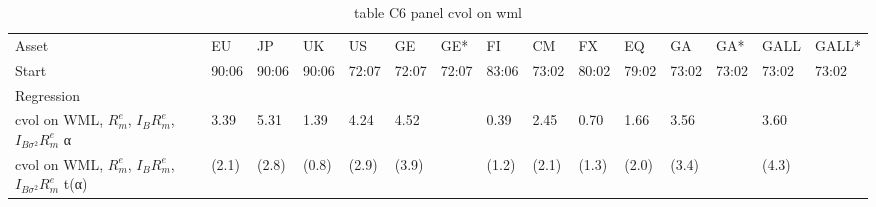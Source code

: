 \begin{table}[htbp]
  \centering
  \caption{table C6 panel cvol on wml}
  \label{tab:table_C6_panel_cvol_on_wml}
  \begin{tabular}{lllllllllllllll}
\toprule
Asset & EU & JP & UK & US & GE & GE* & FI & CM & FX & EQ & GA & GA* & GALL & GALL* \\
Start & 90:06 & 90:06 & 90:06 & 72:07 & 72:07 & 72:07 & 83:06 & 73:02 & 80:02 & 79:02 & 73:02 & 73:02 & 73:02 & 73:02 \\
Regression &  &  &  &  &  &  &  &  &  &  &  &  &  &  \\
\midrule
cvol on WML, $R^e_m$, $I_B R^e_m$, $I_{B\sigma^2} R^e_m$ α & 3.39 & 5.31 & 1.39 & 4.24 & 4.52 &  & 0.39 & 2.45 & 0.70 & 1.66 & 3.56 &  & 3.60 &  \\
cvol on WML, $R^e_m$, $I_B R^e_m$, $I_{B\sigma^2} R^e_m$ t(α) & (2.1) & (2.8) & (0.8) & (2.9) & (3.9) &  & (1.2) & (2.1) & (1.3) & (2.0) & (3.4) &  & (4.3) &  \\
\bottomrule
\end{tabular}

\end{table}
